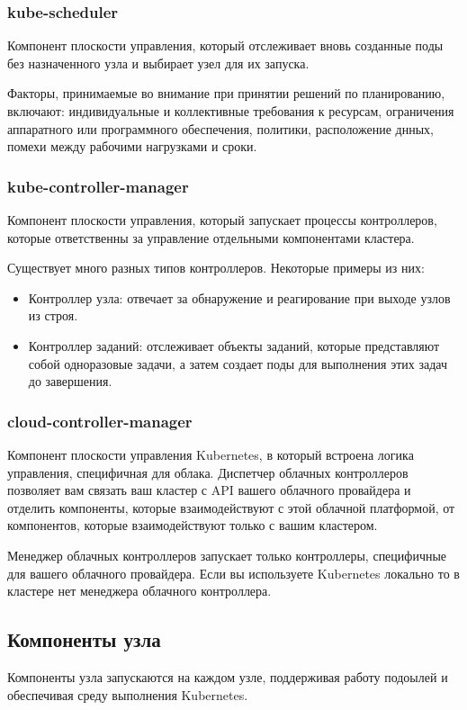 \documentclass[a4page]{article}
\begin{document}
\subsubsection{kube-scheduler}
Компонент плоскости управления, который отслеживает вновь созданные поды без назначенного узла и выбирает узел для их запуска.

Факторы, принимаемые во внимание при принятии решений по планированию, включают: индивидуальные и коллективные требования к ресурсам, ограничения аппаратного или программного обеспечения, политики, расположение днных, помехи между рабочими нагрузками и сроки.

\subsubsection{kube-controller-manager}
Компонент плоскости управления, который запускает процессы контроллеров, которые ответственны за управление отдельными компонентами кластера.

Существует много разных типов контроллеров. Некоторые примеры из них:
\begin{itemize}
   \item Контроллер узла: отвечает за обнаружение и реагирование при выходе узлов из строя.
   \item Контроллер заданий: отслеживает объекты заданий, которые представляют собой одноразовые задачи, а затем создает поды для выполнения этих задач до завершения.
\end{itemize}

\subsubsection{cloud-controller-manager}
Компонент плоскости управления Kubernetes, в который встроена логика \\управления, специфичная для облака. Диспетчер облачных контроллеров позволяет вам связать ваш кластер с API вашего облачного провайдера и отделить компоненты, которые взаимодействуют с этой облачной платформой, от компонентов, которые взаимодействуют только с вашим кластером.

Менеджер облачных контроллеров запускает только контроллеры, специфичные для вашего облачного провайдера. Если вы используете Kubernetes локально то в кластере нет менеджера облачного контроллера.

\subsection{Компоненты узла}
Компоненты узла запускаются на каждом узле, поддерживая работу подоылей и обеспечивая среду выполнения Kubernetes\cite{k8s:n-components}.
\end{document}
